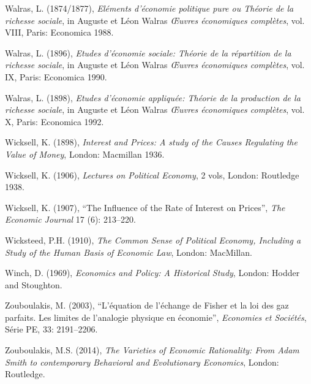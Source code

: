 \documentclass[12pt]{article}
\begin{document}
\begin{description}
    \item Walras, L. (1874/1877), \textit{Eléments d’économie politique pure ou Théorie de la richesse sociale}, in Auguste et Léon Walras \textit{Œuvres économiques complètes}, vol. VIII, Paris: Economica 1988.
    \item Walras, L. (1896), \textit{Etudes d’économie sociale: Théorie de la répartition de la richesse sociale}, in Auguste et Léon Walras \textit{Œuvres économiques complètes}, vol. IX, Paris: Economica 1990.
    \item Walras, L. (1898), \textit{Etudes d’économie appliquée: Théorie de la production de la richesse sociale}, in Auguste et Léon Walras \textit{Œuvres économiques complètes}, vol. X, Paris: Economica 1992.
    \item Wicksell, K. (1898), \textit{Interest and Prices: A study of the Causes Regulating the Value of Money}, London: Macmillan 1936.
    \item Wicksell, K. (1906), \textit{Lectures on Political Economy}, 2 vols, London: Routledge 1938.
    \item Wicksell, K. (1907), “The Influence of the Rate of Interest on Prices”, \textit{The Economic Journal} 17 (6): 213–220.
    \item Wicksteed, P.H. (1910), \textit{The Common Sense of Political Economy, Including a Study of the Human Basis of Economic Law}, London: MacMillan.
    \item Winch, D. (1969), \textit{Economics and Policy: A Historical Study}, London: Hodder and Stoughton.
    \item Zouboulakis, M. (2003), “L’équation de l’échange de Fisher et la loi des gaz parfaits. Les limites de l’analogie physique en économie”, \textit{Economies et Sociétés}, Série PE, 33: 2191–2206.
    \item Zouboulakis, M.S. (2014), \textit{The Varieties of Economic Rationality: From Adam Smith to contemporary Behavioral and Evolutionary Economics}, London: Routledge.
\end{description}
\end{document}
